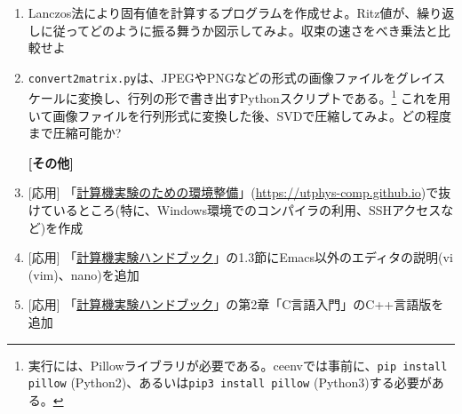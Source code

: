 \documentclass[11pt]{jarticle}
\begin{document}
\begin{enumerate}
\item Lanczos法により固有値を計算するプログラムを作成せよ。Ritz値が、繰り返しに従ってどのように振る舞うか図示してみよ。収束の速さをべき乗法と比較せよ

\item {\tt convert2matrix.py}は、JPEGやPNGなどの形式の画像ファイルをグレイスケールに変換し、行列の形で書き出すPythonスクリプトである。\footnote{実行には、Pillowライブラリが必要である。ceenvでは事前に、{\tt pip install pillow} (Python2)、あるいは{\tt pip3 install pillow} (Python3)する必要がある。} これを用いて画像ファイルを行列形式に変換した後、SVDで圧縮してみよ。どの程度まで圧縮可能か?

  \hspace*{-2em} {\bf [その他]}

\item \mbox{} [応用] 「\href{https://utphys-comp.github.io}{計算機実験のための環境整備}」({\small \href{https://utphys-comp.github.io}{https://utphys-comp.github.io}})で抜けているところ(特に、Windows環境でのコンパイラの利用、SSHアクセスなど)を作成

\item \mbox{} [応用] 「\href{https://github.com/utphys-comp/handbook/releases/download/handbook-2019/handbook.pdf}{計算機実験ハンドブック}」の1.3節にEmacs以外のエディタの説明(vi (vim)、nano)を追加

\item \mbox{} [応用] 「\href{https://github.com/utphys-comp/handbook/releases/download/handbook-2019/handbook.pdf}{計算機実験ハンドブック}」の第2章「C言語入門」のC++言語版を追加

\end{enumerate}  
\end{document}
